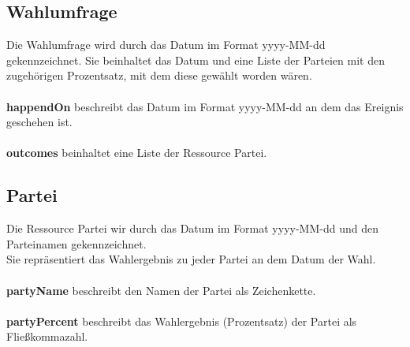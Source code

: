 \documentclass[a4paper,10pt,parskip]{article}
\begin{document}
\subsection{Wahlumfrage}
Die Wahlumfrage wird durch das Datum im Format yyyy-MM-dd gekennzeichnet. Sie beinhaltet das Datum und eine Liste der Parteien mit den zugehörigen Prozentsatz, mit dem diese gewählt worden wären.\\
\\
\textbf{happendOn} beschreibt das Datum im Format yyyy-MM-dd an dem das Ereignis geschehen ist.\\
\\
\textbf{outcomes} beinhaltet eine Liste der Ressource Partei.
\\
\newpage
\subsection{Partei}
Die Ressource Partei wir durch das Datum im Format yyyy-MM-dd und den Parteinamen gekennzeichnet.\\
Sie repräsentiert das Wahlergebnis zu jeder Partei an dem Datum der Wahl.\\
\\
\textbf{partyName} beschreibt den Namen der Partei als Zeichenkette.\\
\\
\textbf{partyPercent} beschreibt das Wahlergebnis (Prozentsatz) der Partei als Fließkommazahl.\\
\\
\end{document}
